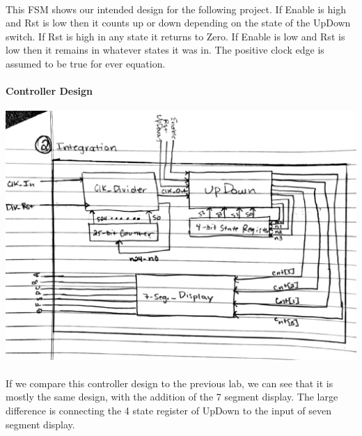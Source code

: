 \documentclass[12pt]{report}
\begin{document}
				\paragraph*{}This FSM shows our intended design for the following project.  
				If Enable is high and Rst is low then it counts up or down depending on the state 
				of the UpDown switch.  If Rst is high in any state it returns to Zero.  If Enable 
				is low and Rst is low then it remains in whatever states it was in.  The positive 
				clock edge is assumed to be true for ever equation.
		\paragraph*{Controller Design}

			\begin{center}
				\includegraphics[scale=.5]{Prelab_7-page2.pdf}
			\end{center}
				\paragraph*{}If we compare this controller design to the previous lab, we can see that it is mostly the same design, with the addition of the 7 segment display.  
				The large difference is connecting the 4 state register of UpDown to the input
				of seven segment display. 
\newpage
\end{document}
